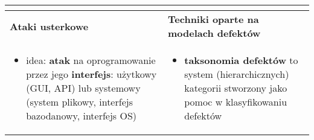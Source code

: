 \documentclass[../main.tex]{subfiles}
\begin{document}
\begin{table}[H]
\begin{center}
\begin{tabular}{| p{8cm} | p{8cm} |}
\begin{itemize}
                \end{itemize} \\
                \hline
                \hline
                \textbf{Ataki usterkowe}   & \textbf{Techniki oparte na modelach defektów}     \\
                \hline
                \begin{itemize}
                    \item idea: \textbf{atak} na oprogramowanie przez jego \textbf{interfejs}: użytkowy (GUI, API)
                    lub systemowy (system plikowy, interfejs bazodanowy, interfejs OS)
                \end{itemize}
                &
                \begin{itemize}
                    \item \textbf{taksonomia defektów} to system (hierarchicznych) kategorii
                    stworzony jako pomoc w klasyfikowaniu defektów
                \end{itemize} \\
                \hline
            \end{tabular}
        \end{center}
    \end{table}
\end{document}
